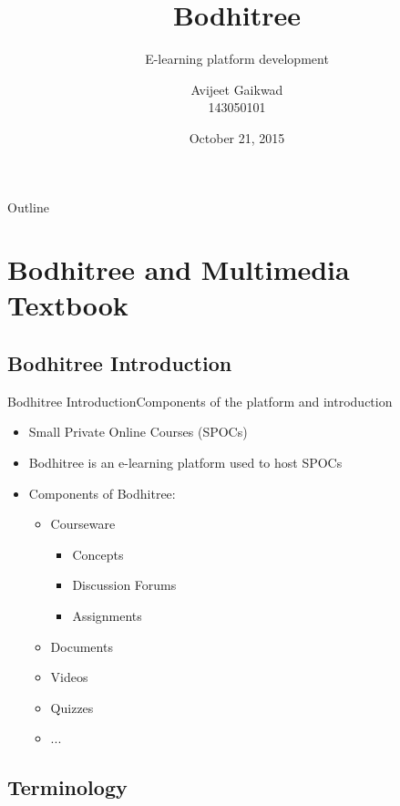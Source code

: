 \documentclass{beamer}
\title{Bodhitree}
\subtitle{E-learning platform development}
\author{Avijeet Gaikwad \\ 143050101}
\institute[] %
{  Guided by \\
	\vspace{0.1cm}
	{\small Prof. Kameswari Chebrolu} \\
	and \\
	{\small Prof. Bhaskaran Raman} \\
	\vspace{0.5cm}
	Department of Computer Science and Engineering\\
  IIT Bombay}
\date{October 21, 2015}
\begin{document}
\begingroup
\begin{frame}[plain]
  \titlepage
\end{frame}
\endgroup

\begin{frame}[allowframebreaks=0.9]{Outline}
  \tableofcontents
\end{frame}

\section{Bodhitree and Multimedia Textbook}

\subsection{Bodhitree Introduction}

\begin{frame}{Bodhitree Introduction}{Components of the platform and introduction}
  \begin{itemize}
  \item {
    Small Private Online Courses (SPOCs)
  }
  \item {
    Bodhitree is an e-learning platform used to host SPOCs
  }
  \item {
  	Components of Bodhitree:
  	\begin{itemize}
  		\item Courseware
  		\begin{itemize}
  			\item Concepts
  			\item Discussion Forums
  			\item Assignments
  		\end{itemize}
  		\item Documents
  		\item Videos
  		\item Quizzes
  		\item ...
  	\end{itemize}
  }
  \end{itemize}
\end{frame}

\subsection*{Terminology}
\end{document}
